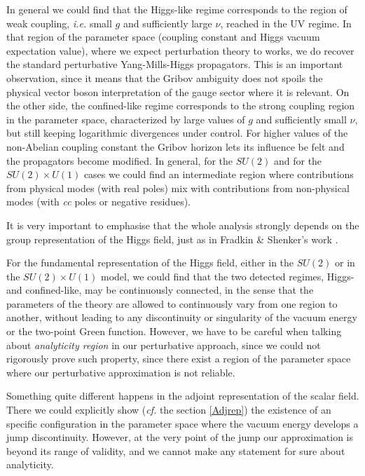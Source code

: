 In general we could find that the Higgs-like regime corresponds to the region of weak coupling,
{\it i.e.} small $g$ and sufficiently large $\nu$, reached in the UV regime. In that region of
the parameter space (coupling constant and Higgs vacuum expectation value), where we expect
perturbation theory to works, we do recover the standard perturbative Yang-Mills-Higgs
propagators. This is an important observation, since it means that the Gribov ambiguity does
not spoils the physical vector boson interpretation of the gauge sector where it is relevant.
On the other side, the confined-like regime corresponds to the strong coupling region in the
parameter space, characterized by large values of $g$ and sufficiently small $\nu$, but still
keeping logarithmic divergences under control. For higher values of the non-Abelian coupling
constant the Gribov horizon lets its influence be felt and the propagators become modified. In
general, for the $SU(2)$ and for the $SU(2)\times U(1)$ cases we could find an intermediate
region where contributions from physical modes (with real poles) mix with contributions from
non-physical modes (with {\it cc} poles or negative residues). 

It is very important to emphasise that the whole analysis strongly depends on the group
representation of the Higgs field, just as in Fradkin \& Shenker's work \cite{Fradkin:1978dv}.

For the fundamental representation of the Higgs field, either in the $SU(2)$ or in the
$SU(2)\times U(1)$ model, we could find that the two detected regimes, Higgs- and
confined-like, may be continuously connected, in the sense that the parameters of the theory
are allowed to continuously vary from one region to another, without leading to any
discontinuity or singularity of the vacuum energy or the two-point Green function. However, we
have to be careful when talking about \emph{analyticity region} in our perturbative approach,
since we could not rigorously prove such property, since there exist a region of the parameter space where our perturbative approximation is not reliable.

Something quite different happens in the adjoint representation of the scalar field. There we
could explicitly show (\emph{cf.} the section \ref{Adjrep}) the existence of an specific
configuration in the parameter space where the vacuum energy develops a jump discontinuity.
However, at the very point of the jump our approximation is beyond its range of
validity, and we cannot make any statement for sure about analyticity.

